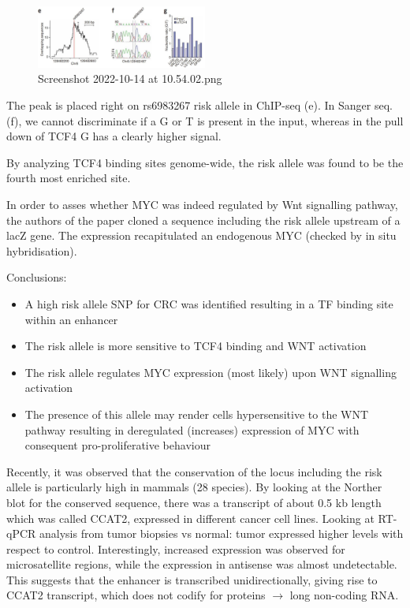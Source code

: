 \begin{figure}
\centering
\includegraphics[width=0.5\textwidth]{../_resources/Screenshot_2022-10-14_at_10-54-02.png}
\caption{Screenshot 2022-10-14 at 10.54.02.png}
\end{figure}

The peak is placed right on rs6983267 risk allele in ChIP-seq (e). In Sanger seq. (f), we cannot discriminate if a G or T is present in the input, whereas in the pull down of TCF4 G has a clearly higher signal.

By analyzing TCF4 binding sites genome-wide, the risk allele was found to be the fourth most enriched site.

In order to asses whether MYC was indeed regulated by Wnt signalling pathway, the authors of the paper cloned a sequence including the risk allele upstream of a lacZ gene. The expression recapitulated an endogenous MYC (checked by in situ hybridisation).

Conclusions:

\begin{itemize}
\tightlist
\item
  A high risk allele SNP for CRC was identified resulting in a TF binding site within an enhancer
\item
  The risk allele is more sensitive to TCF4 binding and WNT activation
\item
  The risk allele regulates MYC expression (most likely) upon WNT signalling activation
\item
  The presence of this allele may render cells hypersensitive to the WNT pathway resulting in deregulated (increases) expression of MYC with consequent pro-proliferative behaviour
\end{itemize}

Recently, it was observed that the conservation of the locus including the risk allele is particularly high in mammals (28 species). By looking at the Norther blot for the conserved sequence, there was a transcript of about 0.5 kb length which was called CCAT2, expressed in different cancer cell lines. Looking at RT-qPCR analysis from tumor biopsies vs normal: tumor expressed higher levels with respect to control. Interestingly, increased expression was observed for microsatellite regions, while the expression in antisense was almost undetectable. This suggests that the enhancer is transcribed unidirectionally, giving rise to CCAT2 transcript, which does not codify for proteins $\rightarrow$ long non-coding RNA.

